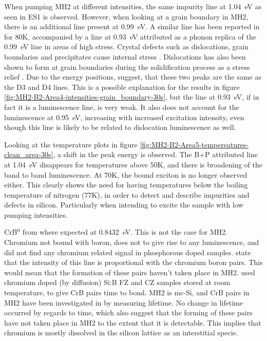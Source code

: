 When pumping MH2 at different intensities, the same impurity line at 1.04~eV as seen in ES1 is observed. However, when looking at a grain boundary in MH2, there is an additional line present at 0.99~eV. A similar line has been reported in \cite{gundel099} for 80K, accompanied by a line at 0.93~eV attributed as a phonon replica of the 0.99~eV line in areas of high stress. Crystal defects such as dislocations, grain boundaries and precipitates cause internal stress \cite{becker07}. Dislocations has also been shown to form at grain boundaries during the solidification process as a stress relief \cite{becker07}. Due to the energy positions, \cite{gundel099} suggest, that these two peaks are the same as the D3 and D4 lines. This is a possible explanation for the results in figure \ref{fig:MH2-B2-Area4-intensities-grain_boundary-30s}, but the line at 0.93~eV, if in fact it is a luminescence line, is very weak. It also does not account for the luminescence at 0.95~eV, increasing with increased excitation intensity, even though this line is likely to be related to dislocation luminescence as well.

Looking at the temperature plots in figure \ref{fig:MH2-B2-Area5-tempereatures-clean_area-30s}, a shift in the peak energy is observed. The B+P attributed line at 1.04~eV disappears for temperatures above 50K, and there is broadening of the band to band luminescence. At 70K, the bound exciton is no longer observed either. This clearly shows the need for having temperatures below the boiling temperature of nitrogen (77K), in order to detect and describe impurities and defects in silicon. Particularly when intending to excite the sample with low pumping intensities.

CrB$^0$ from \cite{conzelmann82} where expected at 0.8432~eV. This is not the case for MH2. Chromium not bound with boron, does not to give rise to any luminescence, and \cite{conzelmann82} did not find any chromium related signal in phosphorous doped samples. \cite{conzelmann82} state that the intensity of this line is proportional with the chromium boron pairs. This would mean that the formation of these pairs haven't taken place in MH2. \cite{conzelmann82} used chromium doped (by diffusion) Si:B FZ and CZ samples stored at room temperature, to give CrB pairs time to bond. MH2 is mc-Si, and CrB pairs in MH2 have been investigated in \cite{hystad09} by measuring lifetime. No change in lifetime occurred by regards to time, which also suggest that the forming of these pairs have not taken place in MH2 to the extent that it is detectable. This implies that chromium is mostly dissolved in the silicon lattice as an interstitial specie.



